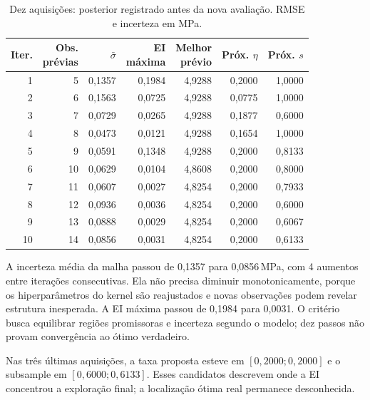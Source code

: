 \documentclass[12pt,a4paper]{article}
\begin{document}
\begin{table}[H]
\centering
\caption{Dez aquisições: posterior registrado antes da nova avaliação. RMSE e incerteza em MPa.}
\footnotesize
\setlength{\tabcolsep}{4.5pt}
\renewcommand{\arraystretch}{1.16}
\begin{adjustbox}{max width=\linewidth}
\begin{tabular}{@{}rrrrrrr@{}}
\toprule
Iter. & \shortstack[r]{Obs.\\prévias} & $\bar\sigma$ & \shortstack[r]{EI\\máxima} & \shortstack[r]{Melhor\\prévio} & Próx. $\eta$ & Próx. $s$ \\
\midrule
1 & 5 & 0{,}1357 & 0{,}1984 & 4{,}9288 & 0{,}2000 & 1{,}0000 \\
2 & 6 & 0{,}1563 & 0{,}0725 & 4{,}9288 & 0{,}0775 & 1{,}0000 \\
3 & 7 & 0{,}0729 & 0{,}0265 & 4{,}9288 & 0{,}1877 & 0{,}6000 \\
4 & 8 & 0{,}0473 & 0{,}0121 & 4{,}9288 & 0{,}1654 & 1{,}0000 \\
5 & 9 & 0{,}0591 & 0{,}1348 & 4{,}9288 & 0{,}2000 & 0{,}8133 \\
6 & 10 & 0{,}0629 & 0{,}0104 & 4{,}8608 & 0{,}2000 & 0{,}8000 \\
7 & 11 & 0{,}0607 & 0{,}0027 & 4{,}8254 & 0{,}2000 & 0{,}7933 \\
8 & 12 & 0{,}0936 & 0{,}0036 & 4{,}8254 & 0{,}2000 & 0{,}6000 \\
9 & 13 & 0{,}0888 & 0{,}0029 & 4{,}8254 & 0{,}2000 & 0{,}6067 \\
10 & 14 & 0{,}0856 & 0{,}0031 & 4{,}8254 & 0{,}2000 & 0{,}6133 \\
\bottomrule
\end{tabular}
\end{adjustbox}
\end{table}

A incerteza média da malha passou de 0{,}1357 para 0{,}0856\,MPa, com 4 aumentos entre iterações consecutivas. Ela não precisa diminuir monotonicamente, porque os hiperparâmetros do kernel são reajustados e novas observações podem revelar estrutura inesperada. A EI máxima passou de 0{,}1984 para 0{,}0031. O critério busca equilibrar regiões promissoras e incerteza segundo o modelo; dez passos não provam convergência ao ótimo verdadeiro.

Nas três últimas aquisições, a taxa proposta esteve em $[0{,}2000;0{,}2000]$ e o subsample em $[0{,}6000;0{,}6133]$. Esses candidatos descrevem onde a EI concentrou a exploração final; a localização ótima real permanece desconhecida.
\end{document}
